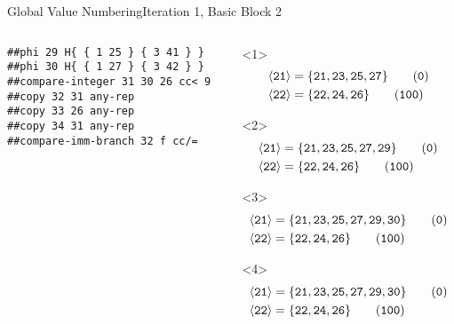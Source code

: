 \documentclass{beamer}
\newcommand{\vn}[1]{\ensuremath{\langle\texttt{#1}\rangle}}
\newcommand{\vreg}[1]{\texttt{#1}}
\begin{document}
\begin{frame}[fragile]{Global Value Numbering}{Iteration 1, Basic Block 2}
  \footnotesize
  \begin{columns}[t,onlytextwidth]
    \begin{column}[t]{.5\textwidth}
      \begin{Verbatim}[frame=single]
##phi 29 H{ { 1 25 } { 3 41 } }
##phi 30 H{ { 1 27 } { 3 42 } }
##compare-integer 31 30 26 cc< 9
##copy 32 31 any-rep
##copy 33 26 any-rep
##copy 34 31 any-rep
##compare-imm-branch 32 f cc/=
      \end{Verbatim}
    \end{column}
    \begin{column}{.5\textwidth}
      \begin{onlyenv}<1>
        \begin{align*}
          \vn{21} &= \{\vreg{21}, \vreg{23}, \vreg{25}, \vreg{27}\} \tag{\texttt{0}}   \\
          \vn{22} &= \{\vreg{22}, \vreg{24}, \vreg{26}\}            \tag{\texttt{100}} \\
        \end{align*}
      \end{onlyenv}
      \begin{onlyenv}<2>
        \begin{align*}
          \vn{21} &= \{\vreg{21}, \vreg{23}, \vreg{25}, \vreg{27}, \vreg{29}\} \tag{\texttt{0}}   \\
          \vn{22} &= \{\vreg{22}, \vreg{24}, \vreg{26}\}            \tag{\texttt{100}} \\
        \end{align*}
      \end{onlyenv}
      \begin{onlyenv}<3>
        \begin{align*}
          \vn{21} &= \{\vreg{21}, \vreg{23}, \vreg{25}, \vreg{27}, \vreg{29}, \vreg{30}\} \tag{\texttt{0}}   \\
          \vn{22} &= \{\vreg{22}, \vreg{24}, \vreg{26}\}            \tag{\texttt{100}} \\
        \end{align*}
      \end{onlyenv}
      \begin{onlyenv}<4>
        \begin{align*}
          \vn{21} &= \{\vreg{21}, \vreg{23}, \vreg{25}, \vreg{27}, \vreg{29}, \vreg{30}\} \tag{\texttt{0}}   \\
          \vn{22} &= \{\vreg{22}, \vreg{24}, \vreg{26}\}            \tag{\texttt{100}} \\

\end{align*}
\end{onlyenv}
\end{column}
\end{columns}
\end{frame}
\end{document}
